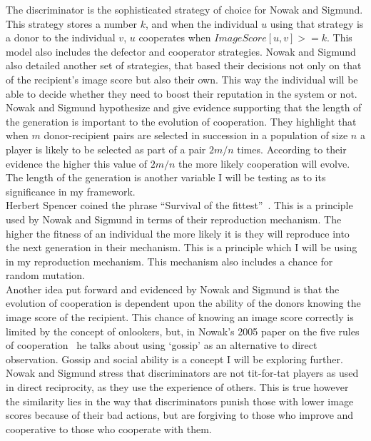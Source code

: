 \documentclass[]{final_report}
\begin{document}
The discriminator is the sophisticated strategy of choice for Nowak and Sigmund. This strategy stores a number $k$, and when the individual $u$ using that strategy is a donor to the individual $v$, $u$ cooperates when $ImageScore[u,v]>=k$. This model also includes the defector and cooperator strategies. Nowak and Sigmund also detailed another set of strategies, that based their decisions not only on that of the recipient's image score but also their own. This way the individual will be able to decide whether they need to boost their reputation in the system or not.\\
Nowak and Sigmund hypothesize and give evidence supporting that the length of the generation is important to the evolution of cooperation. They highlight that when $m$ donor-recipient pairs are selected in succession in a population of size $n$ a player is likely to be selected as part of a pair $2m/n$ times. According to their evidence the higher this value of $2m/n$ the more likely cooperation will evolve. The length of the generation is another variable I will be testing as to its significance in my framework.\\
Herbert Spencer coined the phrase ``Survival of the fittest''~\cite{spencer1864principles}. This is a principle used by Nowak and Sigmund in terms of their reproduction mechanism. The higher the fitness of an individual the more likely it is they will reproduce into the next generation in their mechanism. This is a principle which I will be using in my reproduction mechanism. This mechanism also includes a chance for random mutation.\\
Another idea put forward and evidenced by Nowak and Sigmund is that the evolution of cooperation is dependent upon the ability of the donors knowing the image score of the recipient. This chance of knowing an image score correctly is limited by the concept of onlookers, but, in Nowak's 2005 paper on the five rules of cooperation~\cite{five_rules_coop} he talks about using `gossip' as an alternative to direct observation. Gossip and social ability is a concept I will be exploring further.\\
Nowak and Sigmund stress that discriminators are not tit-for-tat players as used in direct reciprocity, as they use the experience of others. This is true however the similarity lies in the way that discriminators punish those with lower image scores because of their bad actions, but are forgiving to those who improve and cooperative to those who cooperate with them.\\
\end{document}

